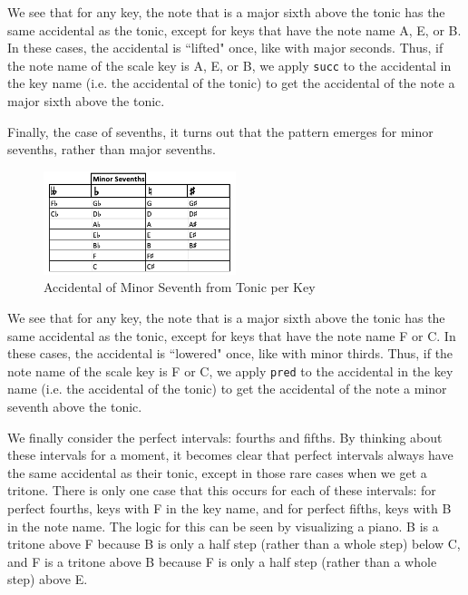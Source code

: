 \documentclass{report}
\begin{document}
We see that for any key, the note that is a major sixth above the tonic has the same accidental as the tonic, except for keys that have the note name A, E, or B. In these  cases, the accidental is ``lifted" once, like with major seconds. Thus, if the note name of the scale key is A, E, or B, we apply \verb.succ. to the accidental in the key name (i.e. the accidental of the tonic) to get the accidental of the note a major sixth above the tonic.

Finally, the case of sevenths, it turns out that the pattern emerges for minor sevenths, rather than major sevenths.

\begin{figure}[h!]
\centering
\includegraphics[width=0.5\textwidth]{images/min_sevenths}
\caption{Accidental of Minor Seventh from Tonic per Key}
\label{min_sevenths}
\end{figure}

We see that for any key, the note that is a major sixth above the tonic has the same accidental as the tonic, except for keys that have the note name F or C. In these  cases, the accidental is ``lowered" once, like with minor thirds. Thus, if the note name of the scale key is F or C, we apply \verb.pred. to the accidental in the key name (i.e. the accidental of the tonic) to get the accidental of the note a minor seventh above the tonic.

We finally consider the perfect intervals: fourths and fifths. By thinking about these intervals for a moment, it becomes clear that perfect intervals always have the same accidental as their tonic, except in those rare cases when we get a tritone. There is only one case that this occurs for each of these intervals: for perfect fourths, keys with F in the key name, and for perfect fifths, keys with B in the note name. The logic for this can be seen by visualizing a piano. B is a tritone above F because B is only a half step (rather than a whole step) below C, and F is a tritone above B because F is only a half step (rather than a whole step) above E.

                        
\end{document}
